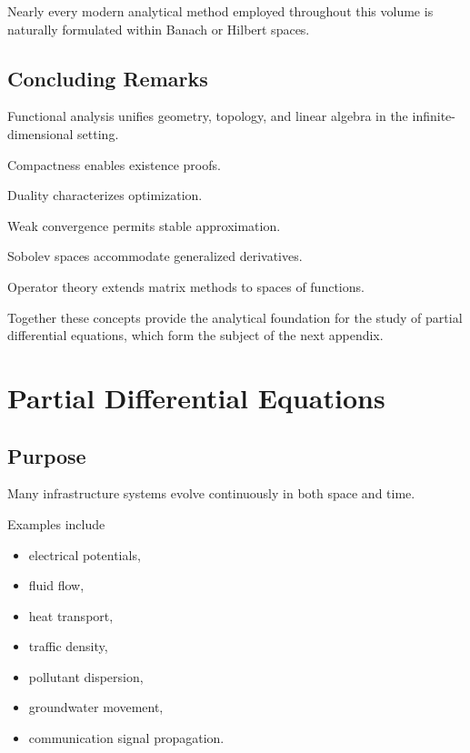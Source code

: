 \documentclass[11pt,fleqn]{book}
\numberwithin{equation}{chapter}
\theoremstyle{plain}
\theoremstyle{definition}
\theoremstyle{remark}
\begin{document}
Nearly every modern analytical method employed throughout this volume is
naturally formulated within Banach or Hilbert spaces.


\section{Concluding Remarks}

Functional analysis unifies geometry, topology, and linear algebra in
the infinite-dimensional setting.

Compactness enables existence proofs.

Duality characterizes optimization.

Weak convergence permits stable approximation.

Sobolev spaces accommodate generalized derivatives.

Operator theory extends matrix methods to spaces of functions.

Together these concepts provide the analytical foundation for the study
of partial differential equations, which form the subject of the next
appendix.

\chapter{Partial Differential Equations}

\section{Purpose}

Many infrastructure systems evolve continuously in both space and time.

Examples include

\begin{itemize}
\item electrical potentials,
\item fluid flow,
\item heat transport,
\item traffic density,
\item pollutant dispersion,
\item groundwater movement,
\item communication signal propagation.
\end{itemize}
\end{document}
